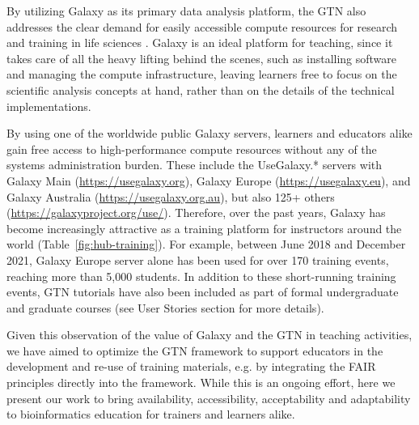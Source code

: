 \documentclass[10pt,letterpaper]{article}
\begin{document}
By utilizing Galaxy as its primary data analysis platform, the GTN also addresses the clear demand for easily accessible compute resources for research and training in life sciences \cite{Barone2017}.
Galaxy is an ideal platform for teaching, since it takes care of all the heavy lifting behind the scenes, such as installing software and managing the compute infrastructure, leaving learners free to focus on the scientific analysis concepts at hand, rather than on the details of the technical implementations. 

By using one of the worldwide public Galaxy servers, learners and educators alike gain free access to high-performance compute resources without any of the systems administration burden. These include the UseGalaxy.* servers with Galaxy Main (\url{https://usegalaxy.org}), Galaxy Europe (\url{https://usegalaxy.eu}), and Galaxy Australia (\url{https://usegalaxy.org.au}), but also 125+ others (\url{https://galaxyproject.org/use/}). 
Therefore, over the past years, Galaxy has become increasingly attractive as a training platform for instructors around the world (Table~\ref{fig:hub-training}). For example, between June 2018 and December 2021, Galaxy Europe server alone has been used for over 170 training events, reaching more than 5,000 students. %
In addition to these short-running training events, GTN tutorials have also been included as part of formal undergraduate and graduate courses (see User Stories section for more details). 

Given this observation of the value of Galaxy and the GTN in teaching activities, we have aimed to optimize the GTN framework to support educators in the development and re-use of training materials, e.g. by integrating the FAIR principles \cite{Wilkinson2016} directly into the framework.
While this is an ongoing effort, here we present our work to bring availability, accessibility, acceptability and adaptability to bioinformatics education for trainers and learners alike.
\end{document}
